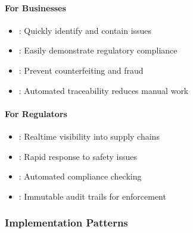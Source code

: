 \documentclass[letterpaper,10pt,english]{sphinxmanual}
\begin{document}
\paragraph{For Businesses}
\label{\detokenize{foundational/intro-to-supply-chain-traceability:for-businesses}}\begin{itemize}
\item {} 
\sphinxAtStartPar
{}: Quickly identify and contain issues

\item {} 
\sphinxAtStartPar
{}: Easily demonstrate regulatory compliance

\item {} 
\sphinxAtStartPar
{}: Prevent counterfeiting and fraud

\item {} 
\sphinxAtStartPar
{}: Automated traceability reduces manual work

\end{itemize}


\paragraph{For Regulators}
\label{\detokenize{foundational/intro-to-supply-chain-traceability:for-regulators}}\begin{itemize}
\item {} 
\sphinxAtStartPar
{}: Real\sphinxhyphen{}time visibility into supply chains

\item {} 
\sphinxAtStartPar
{}: Rapid response to safety issues

\item {} 
\sphinxAtStartPar
{}: Automated compliance checking

\item {} 
\sphinxAtStartPar
{}: Immutable audit trails for enforcement

\end{itemize}


\subsubsection{Implementation Patterns}
\label{\detokenize{foundational/intro-to-supply-chain-traceability:implementation-patterns}}
\end{document}
